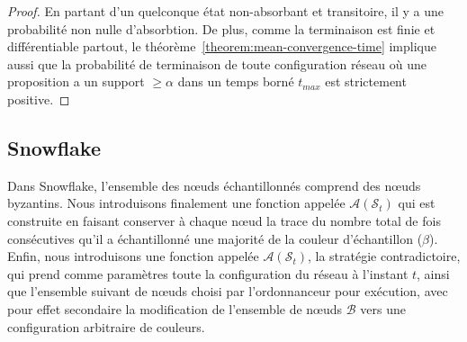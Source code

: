 \documentclass[letterpaper,twocolumn,10pt]{article}
\theoremstyle{definition}
\begin{document}
\begin{appendices}
\begin{proof}
En partant d'un quelconque état non-absorbant et transitoire, il y a une probabilité non nulle d'absorbtion. De plus, comme la terminaison est finie et différentiable partout, le théorème~\ref{theorem:mean-convergence-time} implique aussi que la probabilité de terminaison de toute configuration réseau où une proposition a un support $\geq \alpha$ dans un temps borné $t_{max}$ est strictement positive.
\end{proof}

\subsection{Snowflake}
\label{subsection:appendix_snowflake}
Dans Snowflake, l'ensemble des nœuds échantillonnés comprend des nœuds byzantins.
Nous introduisons finalement une fonction appelée $\mathcal{A}(\mathcal{S}_t)$ qui est construite en faisant conserver à chaque nœud la trace du nombre total de fois consécutives qu'il a échantillonné une majorité de la couleur d'échantillon ($\beta$).
Enfin, nous introduisons une fonction appelée $\mathcal{A}(\mathcal{S}_t)$, la stratégie contradictoire, qui prend comme paramètres toute la configuration du réseau à l'instant $t$, ainsi que l'ensemble suivant de nœuds choisi par l'ordonnanceur pour exécution, avec pour effet secondaire la modification de l'ensemble de nœuds $\mathcal{B}$ vers une configuration arbitraire de couleurs.


\end{appendices}
\end{document}
